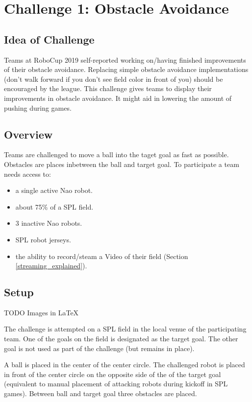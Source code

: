 \section{Challenge 1: Obstacle Avoidance}

\subsection{Idea of Challenge}

Teams at RoboCup 2019 self-reported working on/having finished improvements of their obstacle avoidance. Replacing simple obstacle avoidance implementations (don't walk forward if you don't see field color in front of you) should be encouraged by the league. This challenge gives teams to display their improvements in obstacle avoidance. It might aid in lowering the amount of pushing during games.

\subsection{Overview}

Teams are challenged to move a ball into the taget goal as fast as possible. Obstacles are places inbetween the ball and target goal. To participate a team needs access to:

\begin{itemize}
	\item a single active Nao robot.
	\item about 75\% of a SPL field.
	\item 3 inactive Nao robots.
	\item SPL robot jerseys.
	\item the ability to record/steam a Video of their field (\cf Section \ref{streaming_explained}).
\end{itemize}

\subsection{Setup}

TODO Images in \LaTeX

The challenge is attempted on a SPL field in the local venue of the participating team. One of the goals on the field is designated as the target goal. The other goal is not used as part of the challenge (but remains in place).

A ball is placed in the center of the center circle. The challenged robot is placed in front of the center circle on the opposite side of the of the target goal (equivalent to manual placement of attacking robots during kickoff in SPL games). Between ball and target goal three obstacles are placed.

